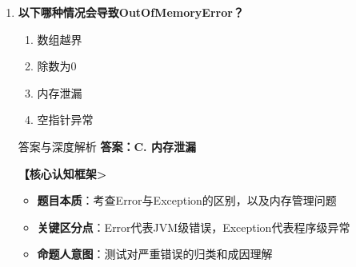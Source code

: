 \documentclass[12pt, a4paper]{ctexart}
\begin{document}
\begin{enumerate}[label=\textbf{\arabic*.}]
\begin{bluebox}{答案与深度解析}
		      \textbf{【应背诵知识点>}
		      \begin{itemize}[label={}, nosep]
			      \item finally块一定会执行（除JVM退出）
			      \item return先保存返回值，finally中修改不影响
			      \item finally中return会覆盖原有返回值
			      \item finally用于资源释放（关闭连接、释放锁）
			      \item 口诀：finally总执行，return先存值，遇System.exit(0)也不行
		      \end{itemize}

		      \textbf{【命题趋势与实战策略】}
		      \textbf{考场秒杀}：看到finally → 无论有无异常必定执行

		      \textbf{高频陷阱清单}：
		      \begin{itemize}[label={}, nosep]
			      \item finally中的return会覆盖try/catch中的return
			      \item finally中修改变量不影响已保存的返回值
			      \item System.exit(0)会让finally不执行
		      \end{itemize}
	      \end{bluebox}

	      \vspace{1em}

	\item \textbf{以下哪种情况会导致OutOfMemoryError？}
	      \begin{enumerate}[label=\Alph*.]
		      \item 数组越界
		      \item 除数为0
		      \item 内存泄漏
		      \item 空指针异常
	      \end{enumerate}

	      \begin{bluebox}{答案与深度解析}
		      \textbf{答案：C. 内存泄漏}

		      \textbf{【核心认知框架>}
		      \begin{itemize}[label={}, leftmargin=*, nosep]
			      \item \textbf{题目本质}：考查Error与Exception的区别，以及内存管理问题
			      \item \textbf{关键区分点}：Error代表JVM级错误，Exception代表程序级异常
			      \item \textbf{命题人意图}：测试对严重错误的归类和成因理解
		      \end{itemize}


\end{bluebox}
\end{enumerate}
\end{document}
